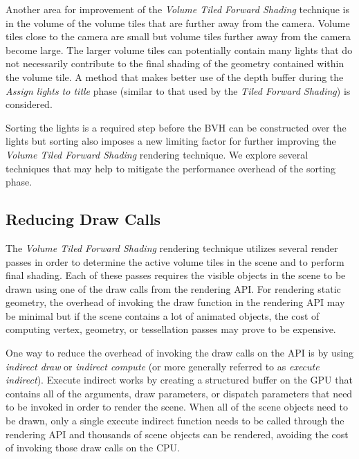 Another area for improvement of the \emph{Volume Tiled Forward Shading} technique is in the volume of the volume tiles that are further away from the camera. Volume tiles close to the camera are small but volume tiles further away from the camera become large. The larger volume tiles can potentially contain many lights that do not necessarily contribute to the final shading of the geometry contained within the volume tile. A method that makes better use of the depth buffer during the \emph{Assign lights to title} phase (similar to that used by the \emph{Tiled Forward Shading}) is considered.


Sorting the lights is a required step before the BVH can be constructed over the lights but sorting also imposes a new limiting factor for further improving the \emph{Volume Tiled Forward Shading} rendering technique. We explore several techniques that may help to mitigate the performance overhead of the sorting phase.

\subsection{Reducing Draw Calls}

The \emph{Volume Tiled Forward Shading} rendering technique utilizes several render passes in order to determine the active volume tiles in the scene and to perform final shading. Each of these passes requires the visible objects in the scene to be drawn using one of the draw calls from the rendering API. For rendering static geometry, the overhead of invoking the draw function in the rendering API may be minimal but if the scene contains a lot of animated objects, the cost of computing vertex, geometry, or tessellation passes may prove to be expensive.

One way to reduce the overhead of invoking the draw calls on the API is by using \emph{indirect draw} or \emph{indirect compute} (or more generally referred to as \emph{execute indirect}). Execute indirect works by creating a structured buffer on the GPU that contains all of the arguments, draw parameters, or dispatch parameters that need to be invoked in order to render the scene. When all of the scene objects need to be drawn, only a single execute indirect function needs to be called through the rendering API and thousands of scene objects can be rendered, avoiding the cost of invoking those draw calls on the CPU.

